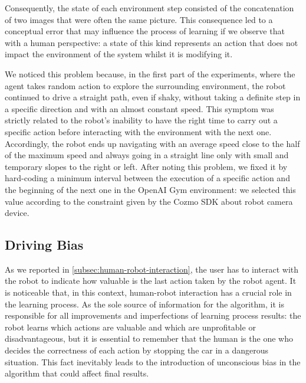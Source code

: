 Consequently, the state of each environment step consisted of the concatenation of two images that were often the same picture.
This consequence led to a conceptual error that may influence the process of learning if we observe that with a human perspective: a state of this kind represents an action that does not impact the environment of the system whilst it is modifying it.

We noticed this problem because, in the first part of the experiments, where the agent takes random action to explore the surrounding environment, the robot continued to drive a straight path, even if shaky, without taking a definite step in a specific direction and with an almost constant speed.
This symptom was strictly related to the robot's inability to have the right time to carry out a specific action before interacting with the environment with the next one.
Accordingly, the robot ends up navigating with an average speed close to the half of the maximum speed and always going in a straight line only with small and temporary slopes to the right or left.
After noting this problem, we fixed it by hard-coding a minimum interval between the execution of a specific action and the beginning of the next one in the OpenAI Gym environment: we selected this value according to the constraint given by the Cozmo SDK about robot camera device.

\subsection{Driving Bias}

As we reported in \vref{subsec:human-robot-interaction}, the user has to interact with the robot to indicate how valuable is the last action taken by the robot agent. It is noticeable that, in this context, human-robot interaction has a crucial role in the learning process.
As the sole source of information for the algorithm, it is responsible for all improvements and imperfections of learning process results: the robot learns which actions are valuable and which are unprofitable or disadvantageous, but it is essential to remember that the human is the one who decides the correctness of each action by stopping the car in a dangerous situation.
This fact inevitably leads to the introduction of unconscious bias in the algorithm that could affect final results.

